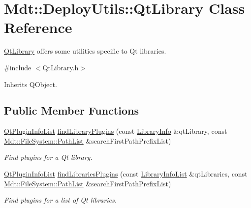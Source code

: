 \hypertarget{class_mdt_1_1_deploy_utils_1_1_qt_library}{}\section{Mdt\+:\+:Deploy\+Utils\+:\+:Qt\+Library Class Reference}
\label{class_mdt_1_1_deploy_utils_1_1_qt_library}


\hyperlink{class_mdt_1_1_deploy_utils_1_1_qt_library}{Qt\+Library} offers some utilities specific to Qt libraries.  




{\ttfamily \#include $<$Qt\+Library.\+h$>$}



Inherits Q\+Object.

\subsection*{Public Member Functions}
\begin{DoxyCompactItemize}
\item 
\hyperlink{class_mdt_1_1_deploy_utils_1_1_qt_plugin_info_list}{Qt\+Plugin\+Info\+List} \hyperlink{class_mdt_1_1_deploy_utils_1_1_qt_library_a613757e2b80129012d564501c9848e80}{find\+Library\+Plugins} (const \hyperlink{class_mdt_1_1_deploy_utils_1_1_library_info}{Library\+Info} \&qt\+Library, const \hyperlink{class_mdt_1_1_file_system_1_1_path_list}{Mdt\+::\+File\+System\+::\+Path\+List} \&search\+First\+Path\+Prefix\+List)
\begin{DoxyCompactList}\small\item\em Find plugins for a Qt library. \end{DoxyCompactList}\item 
\hyperlink{class_mdt_1_1_deploy_utils_1_1_qt_plugin_info_list}{Qt\+Plugin\+Info\+List} \hyperlink{class_mdt_1_1_deploy_utils_1_1_qt_library_a431411e993ea5da5cfb07ae0211f28cc}{find\+Libraries\+Plugins} (const \hyperlink{class_mdt_1_1_deploy_utils_1_1_library_info_list}{Library\+Info\+List} \&qt\+Libraries, const \hyperlink{class_mdt_1_1_file_system_1_1_path_list}{Mdt\+::\+File\+System\+::\+Path\+List} \&search\+First\+Path\+Prefix\+List)
\begin{DoxyCompactList}\small\item\em Find plugins for a list of Qt libraries. \end{DoxyCompactList}\end{DoxyCompactItemize}

